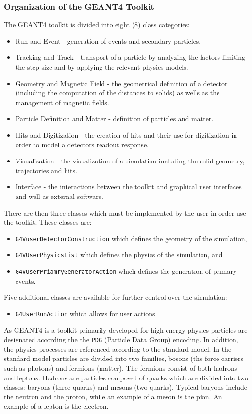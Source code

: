 \subsubsection{Organization of the GEANT4 Toolkit}
The GEANT4 toolkit is divided into eight (8) class categories:
\begin{itemize}
    \item Run and Event - generation of events and secondary particles.
    \item Tracking and Track - transport of a particle by analyzing the factors limiting the step size and by applying the relevant physics models.
    \item Geometry and Magnetic Field - the geometrical definition of a detector (including the computation of the distances to solids) as wells as the management of magnetic fields.
    \item Particle Definition and Matter - definition of particles and matter.
    \item Hits and Digitization - the creation of hits and their use for digitization in order to model a detectors readout response.
    \item Visualization - the visualization of a simulation including the solid geometry, trajectories and hits.
    \item Interface - the interactions between the toolkit and graphical user interfaces and well as external software.
\end{itemize}

There are then three classes which must be implemented by the user in order use the toolkit. These classes are:
\begin{itemize}
    \item \verb+G4VuserDetectorConstruction+ which defines the geometry of the simulation,
    \item \verb+G4VUserPhysicsList+ which defines the physics of the simulation, and
    \item \verb+G4VUserPriamryGeneratorAction+ which defines the generation of primary events.
\end{itemize}
Five additional classes are available for further control over the simulation:
\begin{itemize}
    \item \verb+G4UserRunAction+ which allows for user actions
\end{itemize}

As GEANT4 is a toolkit primarily developed for high energy physics particles are designated according the the \verb+PDG+ (Particle Data Group) encoding.
In addition, the physics processes are referenced according to the standard model.
In the standard model particles are divided into two families, bosons (the force carriers such as photons) and fermions (matter).
The fermions consist of both hadrons and leptons.
Hadrons are particles composed of quarks which are divided into two classes: baryons (three quarks) and mesons (two quarks).
Typical baryons include the neutron and the proton, while an example of a meson is the pion.
An example of a lepton is the electron.
